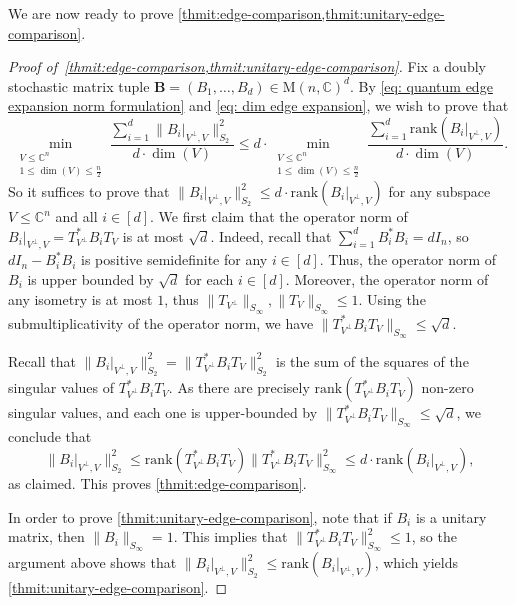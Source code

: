 \documentclass[11pt]{article}
\theoremstyle{plain}
\numberwithin{equation}{section}
\theoremstyle{definition}
\newcommand{\bC}{\mathbb{C}}
\newcommand{\rk}{\mathrm{rank}}
\newcommand{\norm}[1]{\lVert#1\rVert}
\newcommand{\M}{\mathrm{M}}
\newcommand{\tuple}[1]{\mathbf{#1}}
\newcommand{\vB}{\tuple{B}}
\begin{document}
We are now ready to prove \cref{thmit:edge-comparison,thmit:unitary-edge-comparison}.
\begin{proof}[Proof of~\cref{thmit:edge-comparison,thmit:unitary-edge-comparison}]
    Fix a doubly stochastic matrix tuple $\vB = (B_1,\dots,B_d) \in \M(n,\bC)^d$. By \eqref{eq: quantum edge expansion norm formulation} and \eqref{eq: dim edge expansion}, we wish to prove that
    \[
        \min_{\substack{V \leq \bC^n\\1\leq\dim(V)\leq\frac{n}{2}}}\frac{\sum_{i=1}^d\norm{B_i|_{V^\perp,V}}_{S_2}^2}{d\cdot\dim(V)} \leq
        d \cdot 
        \min_{\substack{V \leq \bC^n\\
        1\leq\dim(V)\leq \frac n2}}\frac{\sum_{i=1}^d\rk(B_i|_{V^\perp, V})}{d\cdot\dim(V)}.
    \]
    So it suffices to prove that
    $\norm{B_i|_{V^\perp, V}}_{S_2}^2\leq d\cdot \rk(B_i|_{V^\perp, V})$ for any subspace $V\leq\bC^n$ and all $i\in[d]$. We first claim that the operator norm of $B_i|_{V^\perp, V}=T_{V^\perp}^*B_iT_V$ is at most $\sqrt d$. Indeed, recall that $\sum_{i=1}^d B_i^*B_i=dI_n$, so $dI_n-B_i^*B_i$ is positive semidefinite for any $i\in[d]$. Thus, the operator norm of $B_i$ is upper bounded by $\sqrt d$ for each $i\in[d]$. Moreover, the operator norm of any isometry is at most $1$, thus $\norm{T_{V^\perp}}_{S_\infty},\norm{T_V}_{S_\infty}\leq 1$. Using the submultiplicativity of the operator norm, we have  $\norm{T_{V^\perp}^*B_iT_V}_{S_\infty}\leq \sqrt d$. 

    Recall that $ \norm{B_i|_{V^{\perp},V}}_{S_2}^2 = \norm{T_{V^\perp}^*B_i T_V}_{S_2}^2$ is the sum of the squares of the singular values of $T_{V^\perp}^*B_i T_V$. As there are precisely $\rk(T_{V^\perp}^*B_i T_V)$ non-zero singular values, and each one is upper-bounded by $\norm{T_{V^\perp}^*B_iT_V}_{S_\infty}\leq \sqrt d$, we conclude that 
  \[
  \norm{B_i|_{V^\perp, V}}_{S_2}^2\leq \rk(T_{V^\perp}^*B_iT_V)\norm{T_{V^\perp}^*B_iT_V}_{S_\infty}^2\leq d\cdot \rk(B_i|_{V^\perp, V}),
  \]
  as claimed. This proves \cref{thmit:edge-comparison}.

    In order to prove \cref{thmit:unitary-edge-comparison}, note that 
    if $B_i$ is a unitary matrix, then $\norm{B_i}_{S_\infty}=1$. This implies that $\norm{T_{V^\perp}^* B_i T_V}_{S_\infty}^2 \leq 1$, so the argument above shows that $\norm{B_i|_{V^\perp, V}}_{S_2}^2\leq \rk(B_i|_{V^\perp, V})$, which yields \cref{thmit:unitary-edge-comparison}.
\end{proof}

%
\end{document}
